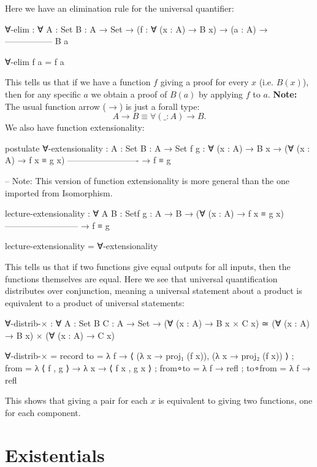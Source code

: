 \documentclass{lecturenotes}
\begin{document}
\newpage

Here we have an elimination rule for the universal quantifier:
\begin{code}
∀-elim : ∀ {A : Set} {B : A → Set} →
  (f : ∀ (x : A) → B x) →
      (a : A) →
  -----------------
        B a

∀-elim f a = f a
\end{code}
This tells us that if we have a function $f$ giving a proof for every $x$ (i.e. $B(x)$), then for any specific $a$ we obtain a proof of $B(a)$ by applying $f$ to $a$.
\newline \textbf{Note:} The usual function arrow ($\rightarrow$) is just a forall type:
\[
A \rightarrow B \equiv \forall (\_ : A) \rightarrow B.
\]
We also have function extensionality:
\begin{code}
postulate
  ∀-extensionality : {A : Set} {B : A → Set} {f g : ∀ (x : A) → B x}
    → (∀ (x : A) → f x ≡ g x)
    -------------------------
            → f ≡ g

-- Note: This version of function extensionality is more general than the one imported from Isomorphism.

lecture-extensionality : ∀ {A B : Set}{f g : A → B}
  → (∀ (x : A) → f x ≡ g x)
  --------------------------
          → f ≡ g

lecture-extensionality = ∀-extensionality
\end{code}
This tells us that if two functions give equal outputs for all inputs, then the functions themselves are equal.
\newline \newline
Here we see that universal quantification distributes over conjunction, 
meaning a universal statement about a product is equivalent to a product of universal statements:
\begin{code}
∀-distrib-× : ∀ {A : Set} {B C : A → Set} →
  (∀ (x : A) → B x × C x) ≃ (∀ (x : A) → B x) × (∀ (x : A) → C x)

∀-distrib-× =
  record
  {
     to      = λ f → ⟨ (λ x → proj₁ (f x)), (λ x → proj₂ (f x)) ⟩
   ; from    = λ { ⟨ f , g ⟩ → λ x → ⟨ f x , g x ⟩ }
   ; from∘to = λ f → refl
   ; to∘from = λ f → refl
   }
\end{code}
This shows that giving a pair for each $x$ is equivalent to giving two functions, one for each component.
\newpage

\section{Existentials}
\label{sec:existentials}
\end{document}
